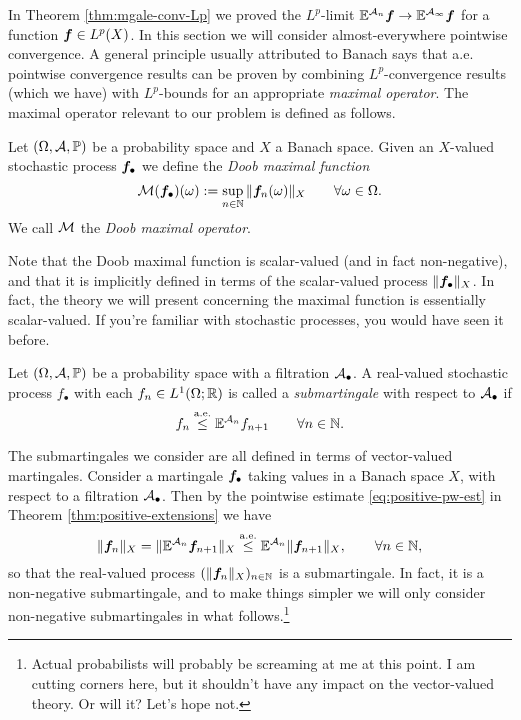 In Theorem \ref{thm:mgale-conv-Lp} we proved the $L^p$-limit $\mathbb{E}^{\mathcal{A}_{n}} \bm{f} \to \mathbb{E}^{\mathcal{A}_{\infty}} \bm{f}$ for a function $\bm{f} \in L^p(X)$.
In this section we will consider almost-everywhere pointwise convergence.
A general principle usually attributed to Banach says that a.e. pointwise convergence results can be proven by combining $L^p$-convergence results (which we have) with $L^p$-bounds for an appropriate \emph{maximal operator}.
The maximal operator relevant to our problem is defined as follows.

\begin{defn}
  Let $(\Omega,\mathcal{A},\mathbb{P})$ be a probability space and $X$ a Banach space.
  Given an $X$-valued stochastic process $\bm{f}_{\bullet}$ we define the \emph{Doob maximal function}
  \begin{equation*}
    \mathcal{M}(\bm{f}_{\bullet})(\omega) := \sup_{n \in \mathbb{N}} \|\bm{f}_{n}(\omega)\|_{X} \qquad \forall \omega \in \Omega.
  \end{equation*}
  We call $\mathcal{M}$ the \emph{Doob maximal operator}.
\end{defn}

Note that the Doob maximal function is scalar-valued (and in fact non-negative), and that it is implicitly defined in terms of the scalar-valued process $\|\bm{f}_{\bullet}\|_{X}$.
In fact, the theory we will present concerning the maximal function is essentially scalar-valued.
If you're familiar with stochastic processes, you would have seen it before.

\begin{defn}
  Let $(\Omega, \mathcal{A}, \mathbb{P})$ be a probability space with a filtration $\mathcal{A}_{\bullet}$.
  A real-valued stochastic process $f_{\bullet}$ with each $f_n \in L^1(\Omega; \mathbb{R})$ is called a \emph{submartingale} with respect to $\mathcal{A}_{\bullet}$ if 
  \begin{equation}\label{eq:mgale-defining-property}
    f_n \stackrel{\mathrm{a.e.}}{\leq} \mathbb{E}^{\mathcal{A}_n} f_{n+1} \qquad \forall n \in \mathbb{N}.
  \end{equation}
\end{defn}

The submartingales we consider are all defined in terms of vector-valued martingales.
Consider a martingale $\bm{f}_{\bullet}$ taking values in a Banach space $X$, with respect to a filtration $\mathcal{A}_{\bullet}$.
Then by the pointwise estimate \eqref{eq:positive-pw-est} in Theorem \ref{thm:positive-extensions} we have
\begin{equation*}
  \|\bm{f}_n\|_X = \|\mathbb{E}^{\mathcal{A}_n} \bm{f}_{n+1}\|_X \stackrel{\mathrm{a.e.}}{\leq} \mathbb{E}^{\mathcal{A}_n} \|\bm{f}_{n+1}\|_X, \qquad \forall n \in \mathbb{N},
\end{equation*}
so that the real-valued process $(\|\bm{f}_{n}\|_X)_{n \in \mathbb{N}}$ is a submartingale.
In fact, it is a non-negative submartingale, and to make things simpler we will only consider non-negative submartingales in what follows.\footnote{Actual probabilists will probably be screaming at me at this point. I am cutting corners here, but it shouldn't have any impact on the vector-valued theory. Or will it? Let's hope not. }

